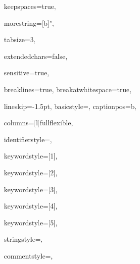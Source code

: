 {%
keepspaces=true,

morestring=[b]{"},

tabsize=3,

extendedchars=false,

sensitive=true,

breaklines=true,
breakatwhitespace=true,

lineskip={-1.5pt},
basicstyle={\ttfamily\small},
captionpos=b,

columns=[l]fullflexible,


identifierstyle={\ttfamily\color{black}},

keywordstyle=[1]{\ttfamily\color{keywordcolor}},

keywordstyle=[2]{\ttfamily\color{sortcolor}},

keywordstyle=[3]{\ttfamily\color{errorcolor}},

keywordstyle=[4]{\ttfamily\color{tacticcolor}},

keywordstyle=[5]{\ttfamily\color{attributecolor}},

stringstyle={\ttfamily\color{stringcolor}},

commentstyle={\ttfamily\itshape\color{commentcolor}},

}

